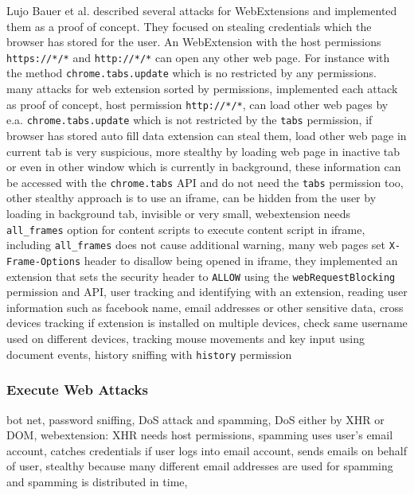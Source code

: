 			Lujo Bauer et al. described several attacks for WebExtensions and implemented them as a proof of concept. They focused on stealing credentials which the browser has stored for the user. An WebExtension with the host permissions \texttt{https://*/*} and \texttt{http://*/*} can open any other web page. For instance with the method \texttt{chrome.tabs.update} which is no restricted by any permissions. \\
			
			\cite{extensions:cns14} many attacks for web extension sorted by permissions, implemented each attack as proof of concept, host permission \texttt{http://*/*}, can load other web pages by e.a. \texttt{chrome.tabs.update} which is not restricted by the \texttt{tabs} permission, if browser has stored auto fill data extension can steal them, load other web page in current tab is very suspicious, more stealthy by loading web page in inactive tab or even in other window which is currently in background, these information can be accessed with the \texttt{chrome.tabs} API and do not need the \texttt{tabs} permission too, other stealthy approach is to use an iframe, can be hidden from the user by loading in background tab, invisible or very small, webextension needs \texttt{all\_frames} option for content scripts to execute content script in iframe, including \texttt{all\_frames} does not cause additional warning, many web pages set \texttt{X-Frame-Options} header to disallow being opened in iframe, they implemented an extension that sets the security header to \texttt{ALLOW} using the \texttt{webRequestBlocking} permission and API, user tracking and identifying with an extension, reading user information such as facebook name, email addresses or other sensitive data, cross devices tracking if extension is installed on multiple devices, check same username used on different devices, tracking mouse movements and key input using document events, history sniffing with \texttt{history} permission \\
	 
	 	\subsubsection{Execute Web Attacks}
	 	
	 		\cite{liu2011botnet, Liu12chromeextensions:} bot net, password sniffing, DoS attack and spamming, DoS either by XHR or DOM, webextension: XHR needs host permissions, spamming uses user's email account, catches credentials if user logs into email account, sends emails on behalf of user, stealthy because many different email addresses are used for spamming and spamming is distributed in time, \\
	 	
